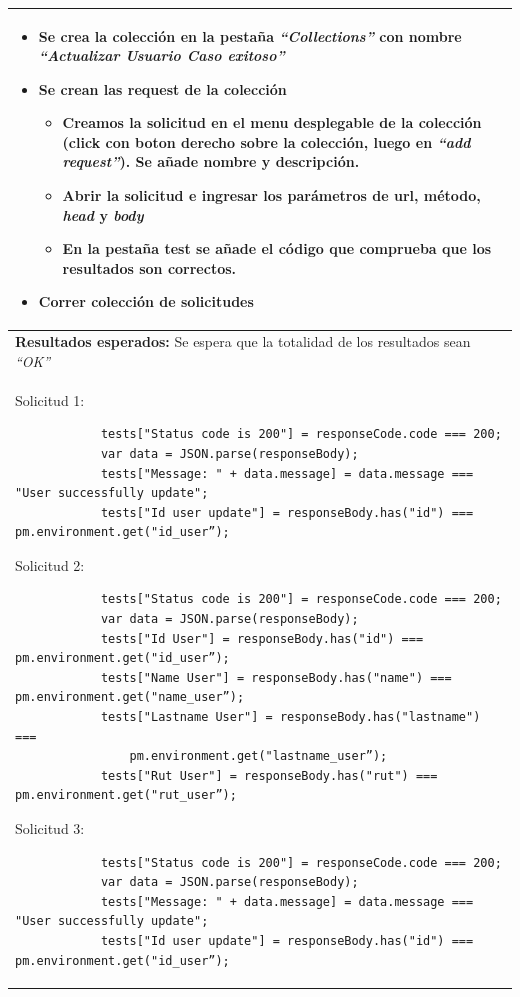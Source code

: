 \begin{table}[H]
\begin{tabular}{|p{}|}
\begin{itemize}
			\item Se crea la colección en la pestaña \textit{“Collections”} con nombre \textit{“Actualizar Usuario Caso exitoso”}
			\item Se crean las request de la colección
			\begin{itemize}
				\item Creamos la solicitud en el menu desplegable de la colección (click con boton derecho sobre la colección, luego en \textit{“add request”}). Se añade nombre  y descripción.
				\item Abrir la solicitud e ingresar los parámetros de url, método, \textit{head} y \textit{body}
				\item En la pestaña test se añade el código que comprueba que los resultados son correctos.
			\end{itemize}
			\item Correr colección de solicitudes
		\end{itemize} \\ \hline
		\textbf{Resultados esperados:} Se espera que la totalidad de los resultados sean \textit{“OK”}\\
		Solicitud 1:
		\begin{verbatim}
			tests["Status code is 200"] = responseCode.code === 200;
			var data = JSON.parse(responseBody);
			tests["Message: " + data.message] = data.message === "User successfully update";
			tests["Id user update"] = responseBody.has("id") === pm.environment.get("id_user”);

		\end{verbatim}

		Solicitud 2:
		\begin{verbatim}
			tests["Status code is 200"] = responseCode.code === 200;
			var data = JSON.parse(responseBody);
			tests["Id User"] = responseBody.has("id") === pm.environment.get("id_user”);
			tests["Name User"] = responseBody.has("name") === pm.environment.get("name_user”);
			tests["Lastname User"] = responseBody.has("lastname") === 
				pm.environment.get("lastname_user”);
			tests["Rut User"] = responseBody.has("rut") === pm.environment.get("rut_user”);

		\end{verbatim}

		Solicitud 3:
		\begin{verbatim}
			tests["Status code is 200"] = responseCode.code === 200;
			var data = JSON.parse(responseBody);
			tests["Message: " + data.message] = data.message === "User successfully update";
			tests["Id user update"] = responseBody.has("id") === pm.environment.get("id_user”);
		\end{verbatim}
		\\ \hline
    \end{tabular}
\end{table}

